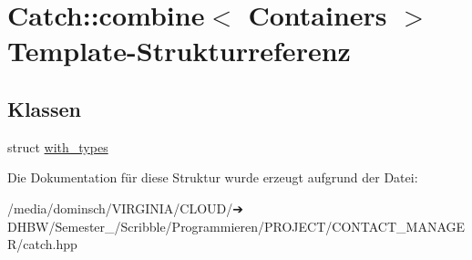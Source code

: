 \hypertarget{structCatch_1_1combine}{}\section{Catch\+:\+:combine$<$ Containers $>$ Template-\/\+Strukturreferenz}
\label{structCatch_1_1combine}
\subsection*{Klassen}
\begin{DoxyCompactItemize}
\item 
struct \hyperlink{structCatch_1_1combine_1_1with__types}{with\+\_\+types}
\end{DoxyCompactItemize}


Die Dokumentation für diese Struktur wurde erzeugt aufgrund der Datei\+:\begin{DoxyCompactItemize}
\item 
/media/dominsch/\+V\+I\+R\+G\+I\+N\+I\+A/\+C\+L\+O\+U\+D/➔ D\+H\+B\+W/\+Semester\+\_/\+Scribble/\+Programmieren/\+P\+R\+O\+J\+E\+C\+T/\+C\+O\+N\+T\+A\+C\+T\+\_\+\+M\+A\+N\+A\+G\+E\+R/catch.\+hpp\end{DoxyCompactItemize}

